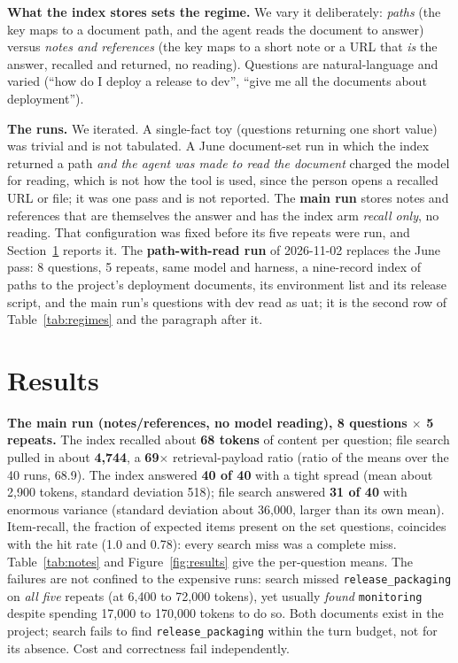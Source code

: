 \documentclass[11pt]{article}
\newcommand{\code}[1]{\texttt{#1}}
\begin{document}
\textbf{What the index stores sets the regime.} We vary it deliberately:
\emph{paths} (the key maps to a document path, and the agent reads the document to
answer) versus \emph{notes and references} (the key maps to a short note or a URL
that \emph{is} the answer, recalled and returned, no reading). Questions are
natural-language and varied (``how do I deploy a release to dev'', ``give me all
the documents about deployment'').

\textbf{The runs.} We iterated. A single-fact toy (questions returning one
short value) was trivial and is not tabulated. A June document-set run in which
the index returned a path \emph{and the agent was made to read the document}
charged the model for reading, which is not how the tool is used, since the
person opens a recalled URL or file; it was one pass and is not reported. The
\textbf{main run} stores notes and references that are themselves the answer and
has the index arm \emph{recall only}, no reading. That configuration was fixed
before its five repeats were run, and Section~\ref{sec:results} reports it. The
\textbf{path-with-read run} of 2026-11-02 replaces the June pass: 8 questions, 5
repeats, same model and harness, a nine-record index of paths to the project's
deployment documents, its environment list and its release script, and the main
run's questions with dev read as uat; it is the second row of
Table~\ref{tab:regimes} and the paragraph after it.

\section{Results}
\label{sec:results}

\textbf{The main run (notes/references, no model reading), 8 questions
$\times$ 5 repeats.} The index recalled about \textbf{68 tokens} of content per
question; file search pulled in about \textbf{4{,}744}, a \textbf{69$\times$}
retrieval-payload ratio (ratio of the means over the 40 runs, 68.9). The index answered \textbf{40 of 40} with
a tight spread (mean about 2{,}900 tokens, standard deviation 518); file search
answered \textbf{31 of 40} with enormous variance (standard
deviation about 36{,}000, larger than its own mean). Item-recall, the fraction of
expected items present on the set questions, coincides with the hit rate (1.0 and
0.78): every search miss was a complete miss. Table~\ref{tab:notes} and
Figure~\ref{fig:results} give the per-question means. The failures are not confined
to the expensive runs: search missed \code{release\_packaging} on \emph{all five}
repeats (at 6{,}400 to 72{,}000 tokens), yet usually \emph{found} \code{monitoring}
despite spending 17{,}000 to 170{,}000 tokens to do so. Both documents exist in the
project; search fails to find \code{release\_packaging} within the turn budget,
not for its absence. Cost and correctness fail independently.
\end{document}
